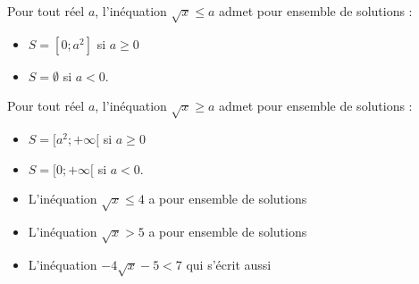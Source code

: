 \begin{minipage}[c]{0.68\linewidth}
\begin{Propriété}
Pour tout réel $a$, l'inéquation $\sqrt{x}\leq a$ admet pour ensemble de solutions :
\begin{itemize}[label=\textcolor{Couleur2}{$\bullet$}]
\item $S=[0;a^2]$ si $a\geq 0$
\item $S=\emptyset$ si $a<0$.
\end{itemize}
Pour tout réel $a$, l'inéquation $\sqrt{x}\geq a$ admet pour ensemble de solutions :
\begin{itemize}[label=\textcolor{Couleur2}{$\bullet$}]
\item $S=[a^2;+\infty[$ si $a\geq 0$
\item $S=[0;+\infty[$ si $a<0$.
\end{itemize}
\end{Propriété}
\begin{Exemple}
\leavevmode\vspace{-\baselineskip}
\begin{itemize}[label=\textcolor{Couleur8}{$\bullet$}]
\item L'inéquation $\sqrt{x}\leq 4$ a pour ensemble de solutions \ligne

\item L'inéquation $\sqrt{x}>5$ a pour ensemble de solutions \ligne

\item L'inéquation $-4\sqrt{x}-5<7$ qui s'écrit aussi \ligne

\ligne

\end{itemize}

\end{Exemple}

\end{minipage} \hfill

